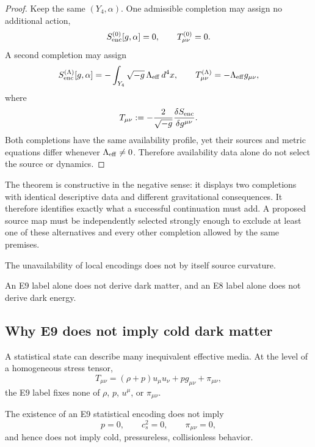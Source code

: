 \documentclass[11pt]{article}
\begin{document}
\begin{proof}
Keep the same $(Y_4,\alpha)$.  One admissible completion may assign no
additional action,
\[
S_{\rm enc}^{(0)}[g,\alpha]=0,
\qquad
T_{\mu\nu}^{(0)}=0.
\]
A second completion may assign
\[
S_{\rm enc}^{(\Lambda)}[g,\alpha]
=-\int_{Y_4}\sqrt{-g}\,\Lambda_{\rm eff}\,d^4x,
\qquad
T_{\mu\nu}^{(\Lambda)}
=-\Lambda_{\rm eff}g_{\mu\nu},
\]
where
\[
T_{\mu\nu}
:=-\frac{2}{\sqrt{-g}}
\frac{\delta S_{\rm enc}}{\delta g^{\mu\nu}}.
\]
Both completions have the same availability profile, yet their sources and
metric equations differ whenever $\Lambda_{\rm eff}\ne0$.  Therefore
availability data alone do not select the source or dynamics.
\end{proof}

The theorem is constructive in the negative sense: it displays two completions
with identical descriptive data and different gravitational consequences.
It therefore identifies exactly what a successful continuation must add.  A
proposed source map must be independently selected strongly enough to exclude
at least one of these alternatives and every other completion allowed by the
same premises.

\begin{corollary}
The unavailability of local encodings does not by itself source curvature.
\end{corollary}

\begin{corollary}
An E9 label alone does not derive dark matter, and an E8 label alone does not
derive dark energy.
\end{corollary}

\subsection{Why E9 does not imply cold dark matter}

A statistical state can describe many inequivalent effective media.  At the
level of a homogeneous stress tensor,
\[
T_{\mu\nu}=(\rho+p)u_\mu u_\nu+p g_{\mu\nu}+\pi_{\mu\nu},
\]
the E9 label fixes none of $\rho$, $p$, $u^\mu$, or $\pi_{\mu\nu}$.

\begin{proposition}
The existence of an E9 statistical encoding does not imply
\[
p=0,\qquad c_s^2=0,\qquad \pi_{\mu\nu}=0,
\]
and hence does not imply cold, pressureless, collisionless behavior.
\end{proposition}
\end{document}
